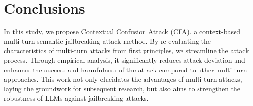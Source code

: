 \section{Conclusions}

In this study, we propose Contextual Confusion Attack (CFA), a context-based multi-turn semantic jailbreaking attack method. By re-evaluating the characteristics of multi-turn attacks from first principles, we streamline the attack process. Through empirical analysis, it significantly reduces attack deviation and enhances the success and harmfulness of the attack compared to other multi-turn approaches. This work not only elucidates the advantages of multi-turn attacks, laying the groundwork for subsequent research, but also aims to strengthen the robustness of LLMs against jailbreaking attacks.